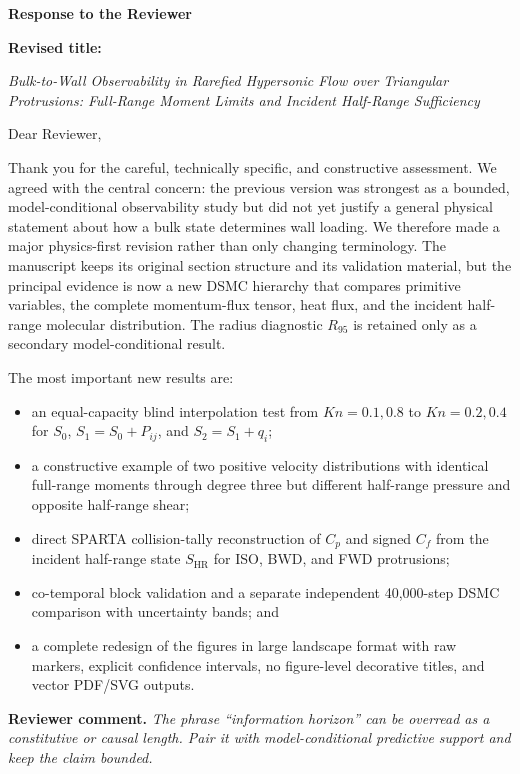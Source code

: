 \documentclass[11pt]{article}
\newcommand{\reviewer}[1]{\vspace{0.4em}\noindent\textbf{Reviewer comment.} \emph{#1}}
\begin{document}
\begin{center}
{\Large\bfseries Response to the Reviewer}\par\vspace{0.6em}
{\bfseries Revised title:}\par
\emph{Bulk-to-Wall Observability in Rarefied Hypersonic Flow over Triangular Protrusions: Full-Range Moment Limits and Incident Half-Range Sufficiency}
\end{center}

Dear Reviewer,

Thank you for the careful, technically specific, and constructive assessment. We agreed with the central concern: the previous version was strongest as a bounded, model-conditional observability study but did not yet justify a general physical statement about how a bulk state determines wall loading. We therefore made a major physics-first revision rather than only changing terminology. The manuscript keeps its original section structure and its validation material, but the principal evidence is now a new DSMC hierarchy that compares primitive variables, the complete momentum-flux tensor, heat flux, and the incident half-range molecular distribution. The radius diagnostic $R_{95}$ is retained only as a secondary model-conditional result.

The most important new results are:
\begin{itemize}[leftmargin=1.5em]
\item an equal-capacity blind interpolation test from $Kn=0.1,0.8$ to $Kn=0.2,0.4$ for $S_0$, $S_1=S_0+P_{ij}$, and $S_2=S_1+q_i$;
\item a constructive example of two positive velocity distributions with identical full-range moments through degree three but different half-range pressure and opposite half-range shear;
\item direct SPARTA collision-tally reconstruction of $C_p$ and signed $C_f$ from the incident half-range state $S_{\mathrm{HR}}$ for ISO, BWD, and FWD protrusions;
\item co-temporal block validation and a separate independent 40,000-step DSMC comparison with uncertainty bands; and
\item a complete redesign of the figures in large landscape format with raw markers, explicit confidence intervals, no figure-level decorative titles, and vector PDF/SVG outputs.
\end{itemize}

\reviewer{The phrase ``information horizon'' can be overread as a constitutive or causal length. Pair it with model-conditional predictive support and keep the claim bounded.}
\end{document}

